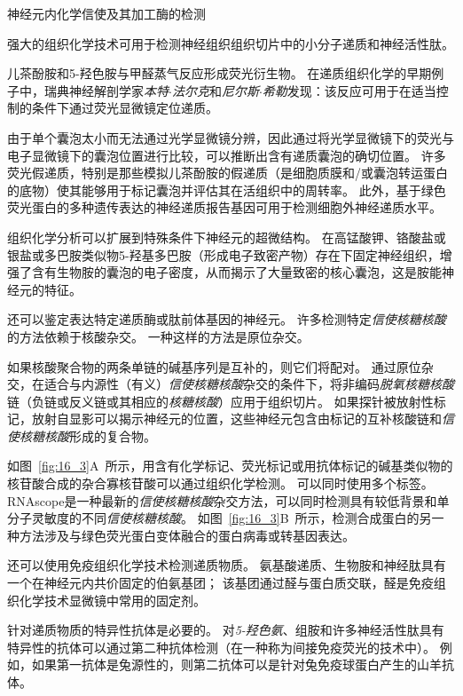 \begin{proposition}[神经解剖学导航术语] \label{box:16_2}
	
	\quad \quad 神经元内化学信使及其加工酶的检测
	
	\quad \quad 强大的组织化学技术可用于检测神经组织组织切片中的小分子递质和神经活性肽。
	
	\quad \quad 儿茶酚胺和5-羟色胺与甲醛蒸气反应形成荧光衍生物。
	在递质组织化学的早期例子中，瑞典神经解剖学家\textit{本特$\cdot$法尔克}和\textit{尼尔斯$\cdot$希勒}发现：该反应可用于在适当控制的条件下通过荧光显微镜定位递质。
	
	\quad \quad 由于单个囊泡太小而无法通过光学显微镜分辨，因此通过将光学显微镜下的荧光与电子显微镜下的囊泡位置进行比较，可以推断出含有递质囊泡的确切位置。
	许多荧光假递质，特别是那些模拟儿茶酚胺的假递质（是细胞质膜和/或囊泡转运蛋白的底物）使其能够用于标记囊泡并评估其在活组织中的周转率。
	此外，基于绿色荧光蛋白的多种遗传表达的神经递质报告基因可用于检测细胞外神经递质水平。
	
	\quad \quad 组织化学分析可以扩展到特殊条件下神经元的超微结构。
	在高锰酸钾、铬酸盐或银盐或多巴胺类似物5-羟基多巴胺（形成电子致密产物）存在下固定神经组织，增强了含有生物胺的囊泡的电子密度，从而揭示了大量致密的核心囊泡，这是胺能神经元的特征。
	
	\quad \quad 还可以鉴定表达特定递质酶或肽前体基因的神经元。
	许多检测特定\textit{信使核糖核酸}的方法依赖于核酸杂交。
	一种这样的方法是原位杂交。
	
	\quad \quad 如果核酸聚合物的两条单链的碱基序列是互补的，则它们将配对。
	通过原位杂交，在适合与内源性（有义）\textit{信使核糖核酸}杂交的条件下，将非编码\textit{脱氧核糖核酸}链（负链或反义链或其相应的\textit{核糖核酸}）应用于组织切片。
	如果探针被放射性标记，放射自显影可以揭示神经元的位置，这些神经元包含由标记的互补核酸链和\textit{信使核糖核酸}形成的复合物。
	
	\quad \quad 如图~\ref{fig:16_3}A~所示，用含有化学标记、荧光标记或用抗体标记的碱基类似物的核苷酸合成的杂合寡核苷酸可以通过组织化学检测。
	可以同时使用多个标签。
	RNAscope是一种最新的\textit{信使核糖核酸}杂交方法，可以同时检测具有较低背景和单分子灵敏度的不同\textit{信使核糖核酸}。
	如图~\ref{fig:16_3}B~所示，检测合成蛋白的另一种方法涉及与绿色荧光蛋白变体融合的蛋白病毒或转基因表达。
	
	\quad \quad 还可以使用免疫组织化学技术检测递质物质。
	氨基酸递质、生物胺和神经肽具有一个在神经元内共价固定的伯氨基团；
	该基团通过醛与蛋白质交联，醛是免疫组织化学技术显微镜中常用的固定剂。
	
	\quad \quad 针对递质物质的特异性抗体是必要的。
	对\textit{5-羟色氨}、组胺和许多神经活性肽具有特异性的抗体可以通过第二种抗体检测（在一种称为间接免疫荧光的技术中）。
	例如，如果第一抗体是兔源性的，则第二抗体可以是针对兔免疫球蛋白产生的山羊抗体。
	

\end{proposition}
